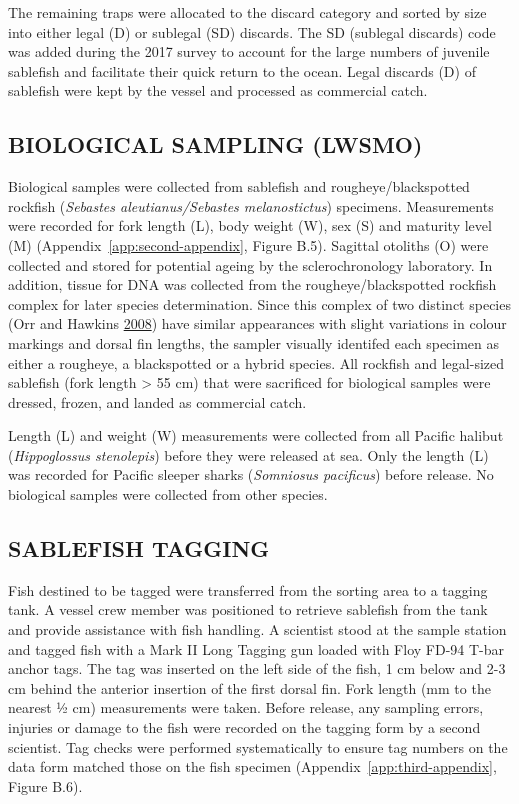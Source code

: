\documentclass[12pt]{article}\usepackage[]{graphicx}\usepackage[]{color}
\begin{document}
The remaining traps were allocated to the discard category and sorted by size into either legal (D) or sublegal (SD) discards. The SD (sublegal discards) code was added during the 2017 survey to account for the large numbers of juvenile sablefish and facilitate their quick return to the ocean. Legal discards (D) of sablefish were kept by the vessel and processed as commercial catch.

\hypertarget{biological-sampling-lwsmo}{%
\subsection{BIOLOGICAL SAMPLING (LWSMO)}\label{biological-sampling-lwsmo}}

Biological samples were collected from sablefish and rougheye/blackspotted rockfish (\emph{Sebastes aleutianus/Sebastes melanostictus}) specimens. Measurements were recorded for fork length (L), body weight (W), sex (S) and maturity level (M) (Appendix~\ref{app:second-appendix}, Figure B.5). Sagittal otoliths (O) were collected and stored for potential ageing by the sclerochronology laboratory. In addition, tissue for DNA was collected from the rougheye/blackspotted rockfish complex for later species determination. Since this complex of two distinct species (Orr and Hawkins \protect\hyperlink{ref-Orr2008}{2008}) have similar appearances with slight variations in colour markings and dorsal fin lengths, the sampler visually identifed each specimen as either a rougheye, a blackspotted or a hybrid species. All rockfish and legal-sized sablefish (fork length \textgreater{} 55 cm) that were sacrificed for biological samples were dressed, frozen, and landed as commercial catch.

Length (L) and weight (W) measurements were collected from all Pacific halibut (\emph{Hippoglossus stenolepis}) before they were released at sea. Only the length (L) was recorded for Pacific sleeper sharks (\emph{Somniosus pacificus}) before release. No biological samples were collected from other species.

\hypertarget{sablefish-tagging}{%
\subsection{SABLEFISH TAGGING}\label{sablefish-tagging}}

Fish destined to be tagged were transferred from the sorting area to a tagging tank. A vessel crew member was positioned to retrieve sablefish from the tank and provide assistance with fish handling. A scientist stood at the sample station and tagged fish with a Mark II Long Tagging gun loaded with Floy FD-94 T-bar anchor tags. The tag was inserted on the left side of the fish, 1 cm below and 2-3 cm behind the anterior insertion of the first dorsal fin. Fork length (mm to the nearest ½ cm) measurements were taken. Before release, any sampling errors, injuries or damage to the fish were recorded on the tagging form by a second scientist. Tag checks were performed systematically to ensure tag numbers on the data form matched those on the fish specimen (Appendix~\ref{app:third-appendix}, Figure B.6).
\end{document}
